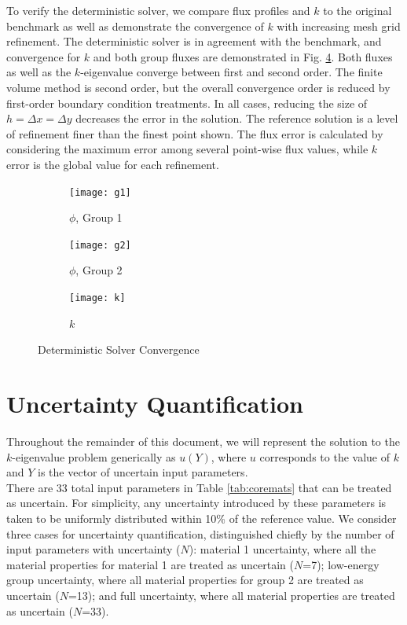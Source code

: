 \documentclass{mc2015}
\begin{document}
To verify the deterministic solver, we compare flux profiles and $k$ to the original benchmark\cite{benchmark} as well as demonstrate the convergence of $k$ with increasing mesh grid refinement.  The deterministic solver is in agreement with the benchmark, and convergence for $k$ and both group fluxes are demonstrated in Fig. \ref{det-conv}.  Both fluxes as well as the $k$-eigenvalue converge between first and second order.  The finite volume method is second order, but the overall convergence order is reduced by first-order boundary condition treatments.  In all cases, reducing the size of $h=\Delta x=\Delta y$ decreases the error in the solution.  The reference solution is a level of refinement finer than the finest point shown.   The flux error is calculated by considering the maximum error among several point-wise flux values, while $k$ error is the global value for each refinement.
\begin{figure}[H]
\centering
  \begin{subfigure}[b]{0.3 \textwidth}
   \texttt{[image: g1]}
   \caption{$\phi$, Group 1}
   \label{g1conv}
  \end{subfigure}
  \begin{subfigure}[b]{0.3 \textwidth}
   \texttt{[image: g2]}
   \caption{$\phi$, Group 2}
   \label{g2conv}
  \end{subfigure}
  \begin{subfigure}[b]{0.3 \textwidth}
   \texttt{[image: k]}
   \caption{$k$}
   \label{kconv}
  \end{subfigure}
  \caption{Deterministic Solver Convergence}
  \label{det-conv}
\end{figure}


\section{Uncertainty Quantification}
Throughout the remainder of this document, we will represent the solution to the $k$-eigenvalue problem generically as $u(Y)$, where $u$ corresponds to the value of $k$ and $Y$ is the vector of uncertain input parameters.\\

There are 33 total input parameters in Table \ref{tab:coremats} that can be treated as uncertain.  For simplicity, any uncertainty introduced by these parameters is taken to be uniformly distributed within 10\% of the reference value.  We consider three cases for uncertainty quantification, distinguished chiefly by the number of input parameters with uncertainty ($N$): material 1 uncertainty, where all the material properties for material 1 are treated as uncertain ($N$=7); low-energy group uncertainty, where all material properties for group 2 are treated as uncertain ($N$=13); and full uncertainty, where all material properties are treated as uncertain ($N$=33).\\
\end{document}
